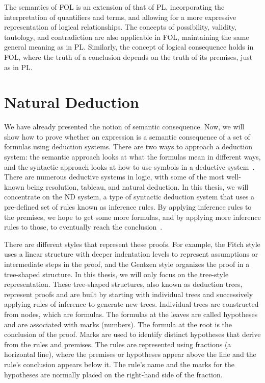 The semantics of \gls{FOL} is an extension of that of \gls{PL}, incorporating the interpretation of quantifiers and terms, and allowing for a more expressive representation of logical relationships. The concepts of possibility, validity, tautology, and contradiction are also applicable in \gls{FOL}, maintaining the same general meaning as in \gls{PL}. Similarly, the concept of logical consequence holds in \gls{FOL}, where the truth of a conclusion depends on the truth of its premises, just as in \gls{PL}.

\section{Natural Deduction} 

\label{chap:prop-deduction}
We have already presented the notion of semantic consequence. Now, we will show how to prove whether an expression is a semantic consequence of a set of formulas using deduction systems. There are two ways to approach a deduction system: the semantic approach looks at what the formulas mean in different ways, and the syntactic approach looks at how to use symbols in a deductive system~\cite{gouveia_lgica}. There are numerous deductive systems in logic, with some of the most well-known being resolution, tableau, and natural deduction. In this thesis, we will concentrate on the \gls{ND} system, a type of syntactic deduction system that uses a pre-defined set of rules known as inference rules. By applying inference rules to the premises, we hope to get some more formulas, and by applying more inference rules to those, to eventually reach the conclusion~\cite{huth_2004_logic}.

There are different styles that represent these proofs. For example, the Fitch style uses a linear structure with deeper indentation levels to represent assumptions or intermediate steps in the proof, and the Gentzen style organizes the proof in a tree-shaped structure. In this thesis, we will only focus on the tree-style representation. These tree-shaped structures, also known as deduction trees, represent proofs and are built by starting with individual trees and successively applying rules of inference to generate new trees. Individual trees are constructed from nodes, which are formulas. The formulas at the leaves are called hypotheses and are associated with marks (numbers). The formula at the root is the conclusion of the proof. Marks are used to identify distinct hypotheses that derive from the rules and premises. The rules are represented using fractions (a horizontal line), where the premises or hypotheses appear above the line and the rule’s conclusion appears below it. The rule’s name and the marks for the hypotheses are normally placed on the right-hand side of the fraction.

